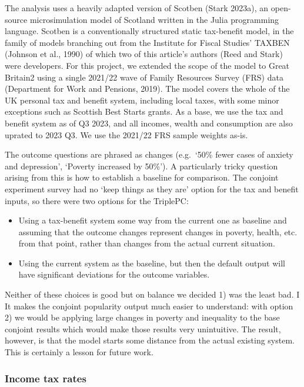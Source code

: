 \documentclass[
  letterpaper,
  DIV=11,
  numbers=noendperiod]{scrartcl}
\providecommand{\tightlist}{%
  \setlength{\itemsep}{0pt}\setlength{\parskip}{0pt}}\usepackage{longtable,booktabs,array}
\begin{document}
The analysis uses a heavily adapted version of Scotben (Stark 2023a), an
open-source microsimulation model of Scotland written in the Julia
programming language. Scotben is a conventionally structured static
tax-benefit model, in the family of models branching out from the
Institute for Fiscal Studies' TAXBEN (Johnson et al., 1990) of which two
of this article's authors (Reed and Stark) were developers. For this
project, we extended the scope of the model to Great Britain2 using a
single 2021/22 wave of Family Resources Survey (FRS) data (Department
for Work and Pensions, 2019). The model covers the whole of the UK
personal tax and benefit system, including local taxes, with some minor
exceptions such as Scottish Best Starts grants. As a base, we use the
tax and benefit system as of Q3 2023, and all incomes, wealth and
consumption are also uprated to 2023 Q3. We use the 2021/22 FRS sample
weights as-is.

The outcome questions are phrased as changes (e.g.~`50\% fewer cases of
anxiety and depression', `Poverty increased by 50\%'). A particularly
tricky question arising from this is how to establish a baseline for
comparison. The conjoint experiment survey had no `keep things as they
are' option for the tax and benefit inputs, so there were two options
for the TriplePC:

\begin{itemize}
\tightlist
\item
  Using a tax-benefit system some way from the current one as baseline
  and assuming that the outcome changes represent changes in poverty,
  health, etc. from that point, rather than changes from the actual
  current situation.
\item
  Using the current system as the baseline, but then the default output
  will have significant deviations for the outcome variables.
\end{itemize}

Neither of these choices is good but on balance we decided 1) was the
least bad. I It makes the conjoint popularity output much easier to
understand: with option 2) we would be applying large changes in poverty
and inequality to the base conjoint results which would make those
results very unintuitive. The result, however, is that the model starts
some distance from the actual existing system. This is certainly a
lesson for future work.

\subsubsection{Income tax rates}\label{income-tax-rates}
\end{document}
